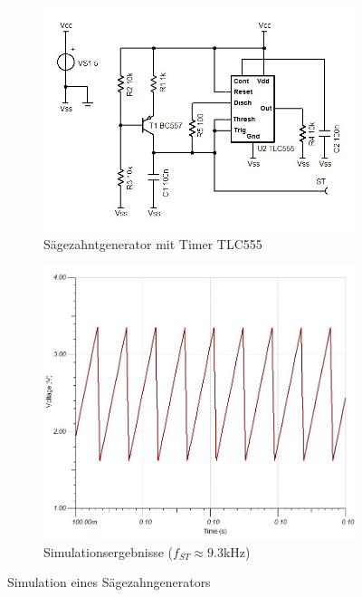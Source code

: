 \begin{figure}[h!]
	\centering
	\begin{subfigure}[b]{0.45\textwidth}
		\includegraphics[width=\textwidth]{src/DC/sim/sch-sawtooth-01.jpg}
		\caption{Sägezahntgenerator mit Timer TLC555}
	\end{subfigure}
	\begin{subfigure}[b]{0.45\textwidth}
		\includegraphics[width=\textwidth]{src/DC/sim/sawtooth-01.jpg}
		\caption{Simulationsergebnisse ($f_{ST} \approx 9.3$kHz)}
	\end{subfigure}
	\caption{Simulation eines Sägezahngenerators}
	\label{fig:sawtooth}
\end{figure}

